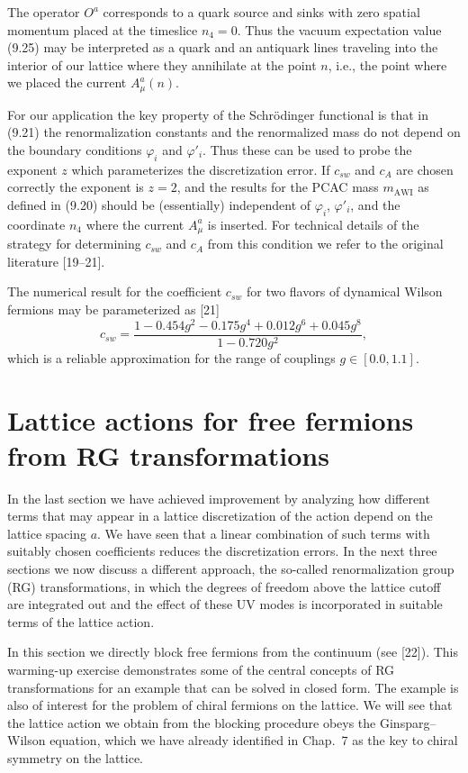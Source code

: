 The operator $O^a$ corresponds to a quark source and sinks with zero spatial
momentum placed at the timeslice $n_4 = 0$. Thus the vacuum expectation value
(9.25) may be interpreted as a quark and an antiquark lines traveling into the
interior of our lattice where they annihilate at the point $n$, i.e., the
point where we placed the current $A^a_\mu(n)$.

For our application the key property of the Schr\"odinger functional is that
in (9.21) the renormalization constants and the renormalized mass do not
depend on the boundary conditions $\varphi_i$ and $\varphi'_i$. Thus these can
be used to probe the exponent $z$ which parameterizes the discretization
error. If $c_{sw}$ and $c_A$ are chosen correctly the exponent is $z = 2$, and
the results for the PCAC mass $m_{\mathrm{AWI}}$ as defined in (9.20) should be
(essentially) independent of $\varphi_i$, $\varphi'_i$, and the coordinate
$n_4$ where the current $A^a_\mu$ is inserted. For technical details of the
strategy for determining $c_{sw}$ and $c_A$ from this condition we refer to the
original literature [19--21].

The numerical result for the coefficient $c_{sw}$ for two flavors of dynamical
Wilson fermions may be parameterized as [21]
\begin{equation}
  c_{sw} = \frac{1 - 0.454g^2 - 0.175g^4 + 0.012g^6 + 0.045g^8}{1 - 0.720g^2} ,
\end{equation}
which is a reliable approximation for the range of couplings $g \in [0.0,
1.1]$.

\section{Lattice actions for free fermions from RG transformations}
\label{sec:9.2}

In the last section we have achieved improvement by analyzing how different
terms that may appear in a lattice discretization of the action depend on the
lattice spacing $a$. We have seen that a linear combination of such terms with
suitably chosen coefficients reduces the discretization errors. In the next
three sections we now discuss a different approach, the so-called
renormalization group (RG) transformations, in which the degrees of freedom
above the lattice cutoff are integrated out and the effect of these UV modes
is incorporated in suitable terms of the lattice action.

In this section we directly block free fermions from the continuum (see [22]).
This warming-up exercise demonstrates some of the central concepts of RG
transformations for an example that can be solved in closed form. The example
is also of interest for the problem of chiral fermions on the lattice. We will
see that the lattice action we obtain from the blocking procedure obeys the
Ginsparg--Wilson equation, which we have already identified in Chap.~7 as the
key to chiral symmetry on the lattice.

